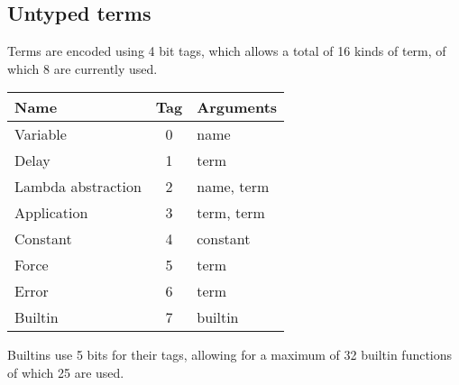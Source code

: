 \documentclass[a4paper]{article}
\newcommand\sep{4pt}
\newcommand{\Strut}{\rule[-2mm]{0mm}{6mm}}
\begin{document}
\begin{appendices}
\subsection{Untyped terms}

Terms are encoded using 4 bit tags, which allows a total of 16 kinds of term, of which 8 are
currently used.

\vspace{1cm}

\begin{minipage}{\linewidth}
\centering
\begin{tabular}{|l|c|l|}
  \hline
  \Strut
  \textrm{Name} & \textrm{Tag} & \textrm{Arguments} \\
  \hline
  Variable & 0 & name \rule{0mm}{4mm} \\[\sep]
  Delay & 1 & term \\[\sep]
  Lambda abstraction & 2 & name, term \\[\sep]
  Application & 3 & term, term \\[\sep]
  Constant & 4 & constant \\[\sep]
  Force & 5 & term \\[\sep]
  Error & 6 & term \\[\sep]
  Builtin & 7 & builtin \\[\sep]
  \hline
\end{tabular}
\label{fig:serialisation-terms}
\end{minipage}

\vspace{1cm}

\noindent Builtins use 5 bits for their tags, allowing for a maximum of 32 builtin
functions of which 25 are used.

\vspace{1cm}


\end{appendices}
\end{document}
